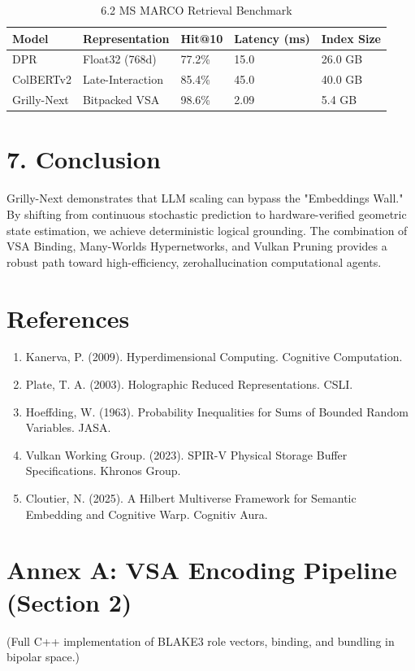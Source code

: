 \documentclass[10pt]{article}
\begin{document}
\begin{table}[h]
\begin{center}
\captionsetup{labelformat=empty}
\caption{6.2 MS MARCO Retrieval Benchmark}
\begin{tabular}{|l|l|l|l|l|}
\hline
Model & Representation & Hit@10 & Latency (ms) & Index Size \\
\hline
DPR & Float32 (768d) & 77.2\% & 15.0 & 26.0 GB \\
\hline
ColBERTv2 & Late-Interaction & 85.4\% & 45.0 & 40.0 GB \\
\hline
Grilly-Next & Bitpacked VSA & 98.6\% & 2.09 & 5.4 GB \\
\hline
\end{tabular}
\end{center}
\end{table}

\section*{7. Conclusion}
Grilly-Next demonstrates that LLM scaling can bypass the "Embeddings Wall." By shifting from continuous stochastic prediction to hardware-verified geometric state estimation, we achieve deterministic logical grounding. The combination of VSA Binding, Many-Worlds Hypernetworks, and Vulkan Pruning provides a robust path toward high-efficiency, zerohallucination computational agents.

\section*{References}
\begin{enumerate}
  \item Kanerva, P. (2009). Hyperdimensional Computing. Cognitive Computation.
  \item Plate, T. A. (2003). Holographic Reduced Representations. CSLI.
  \item Hoeffding, W. (1963). Probability Inequalities for Sums of Bounded Random Variables. JASA.
  \item Vulkan Working Group. (2023). SPIR-V Physical Storage Buffer Specifications. Khronos Group.
  \item Cloutier, N. (2025). A Hilbert Multiverse Framework for Semantic Embedding and Cognitive Warp. Cognitiv Aura.
\end{enumerate}

\section*{Annex A: VSA Encoding Pipeline (Section 2)}
(Full C++ implementation of BLAKE3 role vectors, binding, and bundling in bipolar space.)
\end{document}
